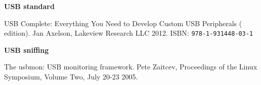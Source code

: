 \documentclass{article}
\begin{document}
\renewcommand{\refname}{References}
\begin{thebibliography}{}

  \item[]\hspace{-\labelwidth}\hspace{-\labelsep}\textbf{USB standard}

   USB Complete: Everything You Need to Develop
               Custom USB Peripherals ( edition).
               Jan Axelson, Lakeview Research LLC 2012.
               ISBN: {\tt   978-1-931448-03-1}
               
  \item[]\hspace{-\labelwidth}\hspace{-\labelsep}\textbf{USB sniffing}
  
   The usbmon: USB monitoring framework. Pete Zaitcev,
  Proceedings of the Linux Symposium, Volume Two, July 20-23 2005.
  \setcounter{firstbib}{\value{enumiv}}
\end{thebibliography}
\end{document}
